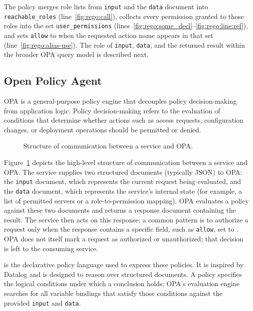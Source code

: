 The policy merges role lists from \texttt{input} and the \texttt{data} document into \texttt{reachable\_roles} (line~\ref{fig:rego:call}), collects every permission granted to those roles into the set \texttt{user\_permissions} (lines~\ref{fig:rego:some_decl}--\ref{fig:rego:line:ref}), and sets \texttt{allow} to \true when the requested action name appears in that set (line~\ref{fig:rego:alias-use}).
The role of \texttt{input}, \texttt{data}, and the returned result within the broader OPA query model is described next.

\subsection{Open Policy Agent}
\label{ssec:opa}

OPA is a general-purpose policy engine that decouples policy decision-making from application logic.
Policy decision-making refers to the evaluation of conditions that determine whether actions such as access requests, configuration changes, or deployment operations should be permitted or denied.

\begin{figure}
    \label{fig:opa-query-graph}
    \centering
    
    \caption{Structure of communication between a service and OPA.}
\end{figure}

Figure~\ref{fig:opa-query-graph} depicts the high-level structure of communication between a service and OPA.
The service supplies two structured documents (typically JSON) to OPA: the \texttt{input} document, which represents the current request being evaluated, and the \texttt{data} document, which represents the service's internal state (for example, a list of permitted servers or a role-to-permission mapping).
OPA evaluates a \rego policy against these two documents and returns a response document containing the result.
The service then acts on this response; a common pattern is to authorize a request only when the response contains a specific field, such as \texttt{allow}, set to \true.
OPA does not itself mark a request as authorized or unauthorized; that decision is left to the consuming service.

\rego is the declarative policy language used to express these policies.
It is inspired by Datalog and is designed to reason over structured documents.
A \rego policy specifies the logical conditions under which a conclusion holds; OPA's evaluation engine searches for all variable bindings that satisfy those conditions against the provided \texttt{input} and \texttt{data}.

